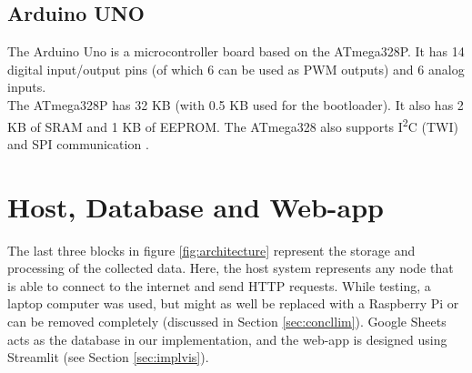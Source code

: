 \documentclass[./RTPostureTrackingReport.tex]{subfiles}
\begin{document}
\subsection{Arduino UNO}
The Arduino Uno is a microcontroller board based on the ATmega328P. It has 14
digital input/output pins (of which 6 can be used as PWM outputs) and 6 analog
inputs. \\ The ATmega328P has 32 KB (with 0.5 KB used for the bootloader). It
also has 2 KB of SRAM and 1 KB of EEPROM. The ATmega328 also supports
I\textsuperscript{2}C (TWI) and SPI communication \cite{arddata}.

\section{Host, Database and Web-app}\label{sec:archhostdb}
The last three blocks in figure \ref{fig:architecture} represent the storage
and processing of the collected data. Here, the host system represents any node
that is able to connect to the internet and send HTTP requests. While testing,
a laptop computer was used, but might as well be replaced with a Raspberry Pi
or can be removed completely (discussed in Section \ref{sec:concllim}). Google
Sheets acts as the database in our implementation, and the web-app is designed
using Streamlit (see Section \ref{sec:implvis}).
\end{document}
